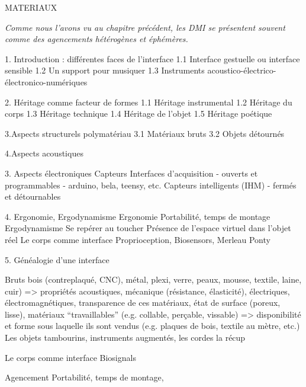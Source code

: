 MATERIAUX

\textit{Comme nous l'avons vu au chapitre précédent, les DMI se présentent souvent comme des agencements hétérogènes et éphémères.}

1. Introduction : différentes faces de l'interface
	1.1 Interface gestuelle ou interface sensible
	1.2 Un support pour musiquer
	1.3 Instruments acoustico-électrico-électronico-numériques
	
2. Héritage comme facteur de formes
	1.1 Héritage instrumental
	1.2 Héritage du corps
	1.3 Héritage technique
	1.4 Héritage de l'objet
	1.5 Héritage poétique

3.Aspects structurels
	polymatériau
	3.1 Matériaux bruts
	3.2 Objets détournés

4.Aspects acoustiques
	

3. Aspects électroniques
	Capteurs
	Interfaces d'acquisition
		- ouverts et programmables
		- arduino, bela, teensy, etc.
	Capteurs intelligents (IHM)
		- fermés et détournables


4. Ergonomie, Ergodynamisme
	Ergonomie
		Portabilité, temps de montage
	Ergodynamisme
		Se repérer au toucher
			Présence de l'espace virtuel dans l'objet réel
		Le corps comme interface
			Proprioception, Biosensors, Merleau Ponty



5. Généalogie d'une interface


	Bruts
		bois (contreplaqué, CNC), métal, plexi, verre, peaux, mousse, textile, laine, cuir)
		=> propriétés acoustiques, mécanique (résistance, élasticité), électriques, électromagnétiques, transparence de ces matériaux, état de surface (poreux, lisse), matériaux ``travaillables'' (e.g. collable, perçable, vissable)
		=> disponibilité et forme sous laquelle ils sont vendus (e.g. plaques de bois, textile au mètre, etc.)
	Les objets
		tambourins, instruments augmentés, les cordes
		la récup

	Le corps comme interface
		Biosignals

	Agencement
		Portabilité, temps de montage, 